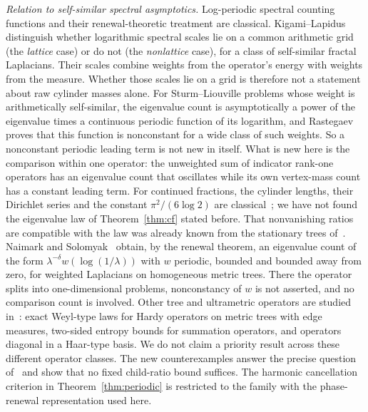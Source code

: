 \documentclass[11pt]{article}
\theoremstyle{definition}
\theoremstyle{remark}
\begin{document}
\emph{Relation to self-similar spectral asymptotics.} Log-periodic
spectral counting functions and their renewal-theoretic treatment are
classical. Kigami--Lapidus~\cite[Thm.~2.4 and Cor.~2.5]{KL} distinguish
whether logarithmic spectral scales lie on a common arithmetic grid
(the \emph{lattice} case) or do not (the \emph{nonlattice} case), for
a class of self-similar fractal Laplacians. Their scales combine weights
from the operator's energy with weights from the measure. Whether those
scales lie on a grid is therefore not a statement about raw cylinder
masses alone. For Sturm--Liouville problems whose weight is
arithmetically self-similar, the eigenvalue count is asymptotically a
power of the eigenvalue times a continuous periodic function of its
logarithm, and
Rastegaev~\cite{Ras} proves that this function is nonconstant for a wide
class of such weights. So a nonconstant periodic leading term is not new
in itself. What is new here is the comparison within one operator: the
unweighted sum of indicator rank-one operators has an eigenvalue count
that oscillates while its own vertex-mass count has a constant leading
term. For continued fractions, the cylinder lengths, their Dirichlet
series and the constant $\pi^2/(6\log2)$ are classical~\cite[Section~8.3]{CFV};
we have not found the eigenvalue law of Theorem~\ref{thm:cf} stated
before. That nonvanishing ratios are compatible with the law was
already known from the stationary trees of~\cite[Prop.~B.1]{K26}.
Naimark and Solomyak~\cite[Example~8.1]{NS} obtain, by the renewal
theorem, an eigenvalue count of the form $\lambda^{-\delta}w(\log(1/\lambda))$
with $w$ periodic, bounded and bounded away from zero, for weighted
Laplacians on homogeneous metric trees. There the operator splits into
one-dimensional problems, nonconstancy of $w$ is not asserted, and no
comparison count is involved. Other tree and ultrametric operators are
studied in~\cite{EHL,LL,BGPW}: exact Weyl-type laws for Hardy operators
on metric trees with edge measures, two-sided entropy bounds for summation
operators, and operators diagonal in a Haar-type basis. We do not claim a
priority result across these different operator classes. The new
counterexamples answer the precise question of~\cite{K26} and show
that no fixed child-ratio bound suffices. The harmonic cancellation
criterion in Theorem~\ref{thm:periodic} is restricted to the family
with the phase-renewal representation used here.
\end{document}
